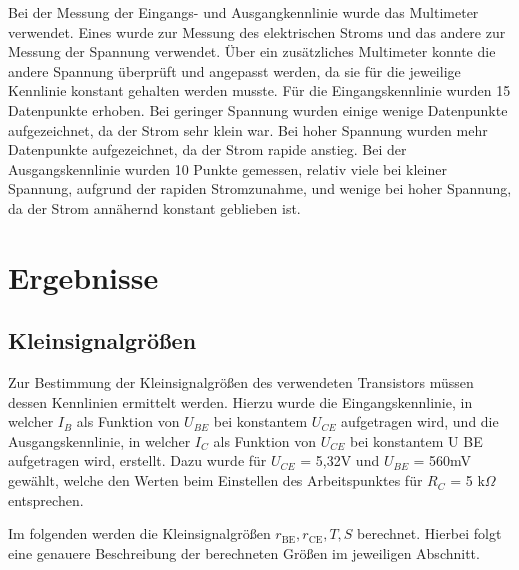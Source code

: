 \documentclass[a4paper,usenatbib]{aspdoc}
\begin{document}
    \noindent Bei der Messung der Eingangs- und Ausgangkennlinie wurde das Multimeter verwendet. Eines wurde zur Messung des elektrischen Stroms und das andere zur Messung der Spannung verwendet. Über ein zusätzliches Multimeter konnte die andere Spannung überprüft und angepasst werden, da sie für die jeweilige Kennlinie konstant gehalten werden musste. Für die Eingangskennlinie wurden 15 Datenpunkte erhoben. Bei geringer Spannung wurden einige wenige Datenpunkte aufgezeichnet, da der Strom sehr klein war. Bei hoher Spannung wurden mehr Datenpunkte aufgezeichnet, da der Strom rapide anstieg. Bei der Ausgangskennlinie wurden 10 Punkte gemessen, relativ viele bei kleiner Spannung, aufgrund der rapiden Stromzunahme, und wenige bei hoher Spannung, da der Strom annähernd konstant geblieben ist.
    
    
    
    
    \section{Ergebnisse}
        
        \subsection{Kleinsignalgrößen}
            Zur Bestimmung der Kleinsignalgrößen des verwendeten Transistors müssen dessen Kennlinien ermittelt werden. Hierzu wurde die Eingangskennlinie, in welcher $I_B$ als Funktion von $U_{BE}$ bei konstantem $U_{CE}$ aufgetragen wird, und die Ausgangskennlinie, in welcher $I_C$ als Funktion von $U_{CE}$ bei konstantem U BE aufgetragen wird, erstellt. Dazu wurde für $U_{CE}$ = 5,32V und $U_{BE}$ = 560mV gewählt, welche den Werten beim Einstellen des Arbeitspunktes für $R_C$ = 5 k$\Omega$ entsprechen.
            
            \noindent Im folgenden werden die Kleinsignalgrößen $r_{\mathrm{BE}}, r_{\mathrm{CE}}, T, S$ berechnet. Hierbei folgt eine genauere Beschreibung der berechneten Größen im jeweiligen Abschnitt.
            
\end{document}
